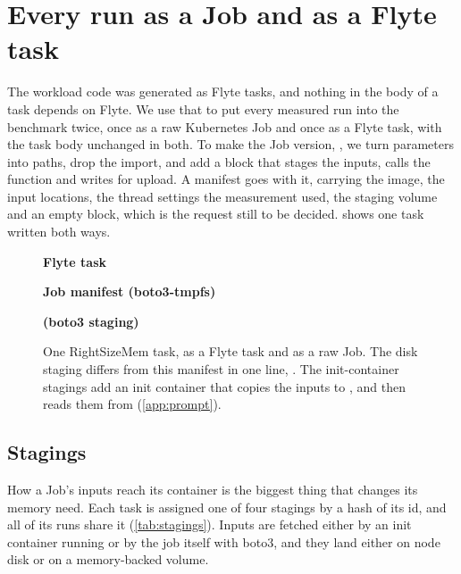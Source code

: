 \section{Every run as a Job and as a Flyte task}
\label{sec:twins}

The workload code was generated as Flyte tasks, and nothing in the body of a task
depends on Flyte. We use that to put every measured run into the benchmark twice, once as
a raw Kubernetes Job and once as a Flyte task, with the task body unchanged in both. To
make the Job version, , we turn  parameters into paths, drop the
 import, and add a  block that stages the inputs, calls the
function and writes  for upload. A  manifest goes with
it, carrying the image, the input locations, the thread settings the measurement used,
the staging volume and an empty  block, which is the request still to be
decided.  shows one task written both ways.

\begin{figure}[tbp]
\centering
\begin{minipage}[t]{0.48\linewidth}
\textbf{\small Flyte task}

\textbf{\small Job manifest (boto3-tmpfs)}

\end{minipage}\hfill
\begin{minipage}[t]{0.50\linewidth}
\textbf{\small {} (boto3 staging)}

\end{minipage}
\caption{One RightSizeMem task, as a Flyte task and as a raw Job. The disk staging
differs from this manifest in one line, . The init-container
stagings add an  init container that copies the inputs to , and
 then reads them from  (\cref{app:prompt}).}
\label{fig:twin}
\end{figure}

\subsection{Stagings}
How a Job's inputs reach its container is the biggest thing that changes its memory
need. Each task is assigned one of four stagings by a hash of its id, and all of its runs
share it (\cref{tab:stagings}). Inputs are fetched either by an init container running
 or by the job itself with boto3, and they land either on node disk or on a
memory-backed volume.

